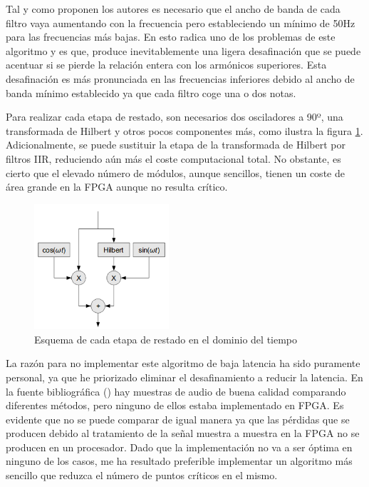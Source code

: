 Tal y como proponen los autores es necesario que el ancho de banda de cada filtro vaya aumentando con la frecuencia pero estableciendo un mínimo de 50Hz para las frecuencias más bajas. En esto radica uno de los problemas de este algoritmo y es que, produce inevitablemente una ligera desafinación que se puede acentuar si se pierde la relación entera con los armónicos superiores. Esta desafinación es más pronunciada en las frecuencias inferiores debido al ancho de banda mínimo establecido ya que cada filtro coge una o dos notas.

Para realizar cada etapa de restado, son necesarios dos osciladores a 90º, una transformada de Hilbert y otros pocos componentes más, como ilustra la figura \ref{fig:restahil}. Adicionalmente, se puede sustituir la etapa de la transformada de Hilbert por filtros IIR, reduciendo aún más el coste computacional total. No obstante, es cierto que el elevado número de módulos, aunque sencillos, tienen un coste de área grande en la FPGA aunque no resulta crítico.

\begin{figure}[!t]
\begin{center}
\includegraphics[width=5cm]{img/fs_hilbert.png}
\caption{\label{fig:restahil}Esquema de cada etapa de restado en el dominio del tiempo}
\end{center}
\end{figure}

La razón para no implementar este algoritmo de baja latencia ha sido puramente personal, ya que he priorizado eliminar el desafinamiento a reducir la latencia. En la fuente bibliográfica (\cite{hilbert}) hay muestras de audio de buena calidad comparando diferentes métodos, pero ninguno de ellos estaba implementado en FPGA. Es evidente que no se puede comparar de igual manera ya que las pérdidas que se producen debido al tratamiento de la señal muestra a muestra en la FPGA no se producen en un procesador. Dado que la implementación no va a ser óptima en ninguno de los casos, me ha resultado preferible implementar un algoritmo más sencillo que reduzca el número de puntos críticos en el mismo.

